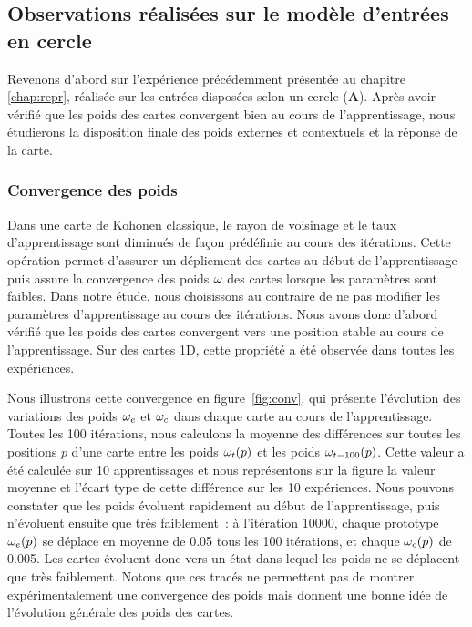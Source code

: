 \documentclass[../main]{subfiles}
\begin{document}
\subsection{Observations réalisées sur le modèle d'entrées en cercle}

Revenons d'abord sur l'expérience précédemment présentée au chapitre \ref{chap:repr}, réalisée sur les entrées disposées selon un cercle (\textbf{A}).
Après avoir vérifié que les poids des cartes convergent bien au cours de l'apprentissage, nous étudierons la disposition finale des poids externes et contextuels et la réponse de la carte.

\subsubsection{Convergence des poids}

Dans une carte de Kohonen classique, le rayon de voisinage et le taux d'apprentissage sont diminués de façon prédéfinie au cours des itérations. 
Cette opération permet d'assurer un dépliement des cartes au début de l'apprentissage puis assure la convergence des poids $\omega$ des cartes lorsque les paramètres sont faibles.
Dans notre étude, nous choisissons au contraire de ne pas modifier les paramètres d'apprentissage au cours des itérations.
Nous avons donc d'abord vérifié que les poids des cartes convergent vers une position stable au cours de l'apprentissage. Sur des cartes 1D, cette propriété a été observée dans toutes les expériences.

Nous illustrons cette convergence en figure~\ref{fig:conv}, qui présente l'évolution des variations des poids $\omega_{e}$ et $\omega_{c}$ dans chaque carte au cours de l'apprentissage. 
Toutes les 100 itérations, nous calculons la moyenne des différences sur toutes les positions $p$ d'une carte entre les poids $\omega_t(p)$ et les poids $\omega_{t-100}(p)$. 
Cette valeur a été calculée sur 10 apprentissages et nous représentons sur la figure la valeur moyenne et l'écart type de cette différence sur les 10 expériences.
Nous pouvons constater que les poids évoluent rapidement au début de l'apprentissage, puis n'évoluent ensuite que très faiblement~: à l'itération 10000, chaque prototype $\omega_e(p)$ se déplace en moyenne de 0.05 tous les 100 itérations, et chaque $\omega_c(p)$ de 0.005. Les cartes évoluent donc vers un état dans lequel les poids ne se déplacent que très faiblement.
Notons que ces tracés ne permettent pas de montrer expérimentalement une convergence des poids mais donnent une bonne idée de l'évolution générale des poids des cartes.
\end{document}
